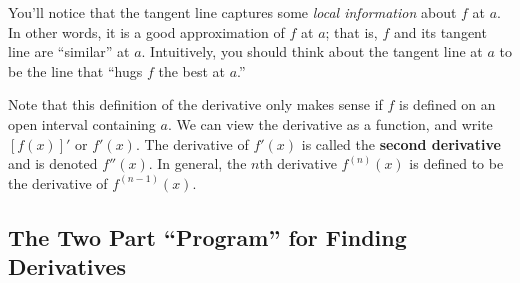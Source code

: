 \begin{multicols}{2}
{

}

\end{multicols}


You'll notice that the tangent line captures some \textit{local information} about $f$ at $a$. In other words, it is a good approximation of $f$ at $a$; that is, $f$ and its tangent line are ``similar'' at $a$. Intuitively, you should think about the tangent line at $a$ to be the line that ``hugs $f$ the best at $a$.''

Note that this definition of the derivative only makes sense if $f$ is defined on an open interval containing $a$. We can view the derivative as a function, and write $[f(x)]'$ or $f'(x)$. The derivative of $f'(x)$ is called the \textbf{second derivative} and is denoted $f''(x)$. In general, the $n$th derivative $f^{(n)}(x)$ is defined to be the derivative of $f^{(n-1)}(x)$.

\subsection{The Two Part ``Program'' for Finding Derivatives}


